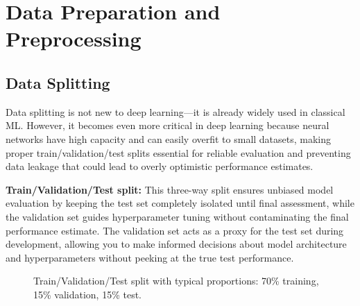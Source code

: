 
\section{Data Preparation and Preprocessing }
\label{sec:data-preparation}

\subsection{Data Splitting}

\begin{remark}
Data splitting is not new to deep learning—it is already widely used in classical ML. However, it becomes even more critical in deep learning because neural networks have high capacity and can easily overfit to small datasets, making proper train/validation/test splits essential for reliable evaluation and preventing data leakage that could lead to overly optimistic performance estimates.
\end{remark}

\textbf{Train/Validation/Test split:} This three-way split ensures unbiased model evaluation by keeping the test set completely isolated until final assessment, while the validation set guides hyperparameter tuning without contaminating the final performance estimate. The validation set acts as a proxy for the test set during development, allowing you to make informed decisions about model architecture and hyperparameters without peeking at the true test performance.

\begin{figure}[h]
  \centering
  \caption{Train/Validation/Test split with typical proportions: 70\% training, 15\% validation, 15\% test.}
  \label{fig:data-split}
\end{figure}

